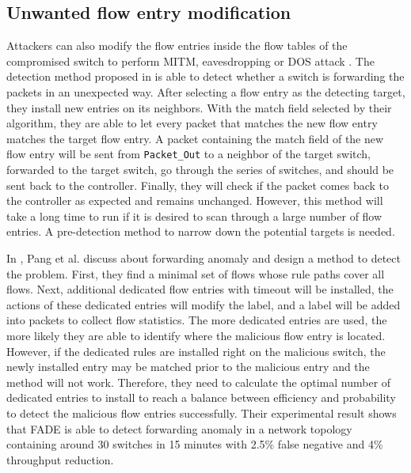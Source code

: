 \subsection{Unwanted flow entry modification}
Attackers can also modify the flow entries inside the flow tables of the compromised switch to perform MITM, eavesdropping or DOS attack \cite{AAS14}. The detection method proposed in \cite{CKGL15} is able to detect whether a switch is forwarding the packets in an unexpected way. After selecting a flow entry as the detecting target, they install new entries on its neighbors. With the match field selected by their algorithm, they are able to let every packet that matches the new flow entry matches the target flow entry. A packet containing the match field of the new flow entry will be sent from \texttt{Packet\_Out} to a neighbor of the target switch, forwarded to the target switch, go through the series of switches, and should be sent back to the controller. Finally, they will check if the packet comes back to the controller as expected and remains unchanged. However, this method will take a long time to run if it is desired to scan through a large number of flow entries. A pre-detection method to narrow down the potential targets is needed.

In \cite{PJL16}, Pang et al. discuss about forwarding anomaly and design a method to detect the problem. First, they find a minimal set of flows whose rule paths cover all flows. Next, additional dedicated flow entries with timeout will be installed, the actions of these dedicated entries will modify the label, and a label will be added into packets to collect flow statistics. The more dedicated entries are used, the more likely they are able to identify where the malicious flow entry is located. However, if the dedicated rules are installed right on the malicious switch, the newly installed entry may be matched prior to the malicious entry and the method will not work. Therefore, they need to calculate the optimal number of dedicated entries to install to reach a balance between efficiency and probability to detect the malicious flow entries successfully. Their experimental result shows that FADE is able to detect forwarding anomaly in a network topology containing around 30 switches in 15 minutes with 2.5\% false negative and 4\% throughput reduction.

